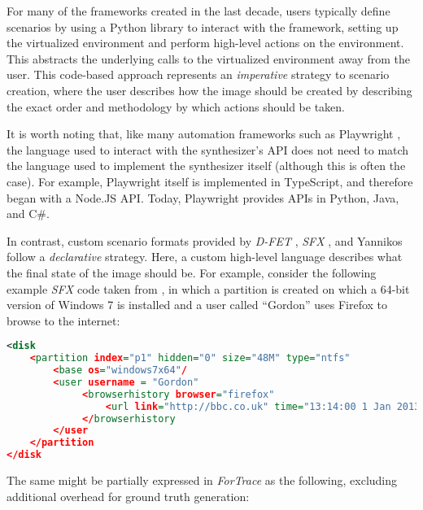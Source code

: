 For many of the frameworks created in the last decade, users typically
define scenarios by using a Python library to interact with the
framework, setting up the virtualized environment and perform high-level
actions on the environment. This abstracts the underlying calls to the
virtualized environment away from the user. This code-based approach
represents an \emph{imperative} strategy to scenario creation, where the
user describes how the image should be created by describing the exact
order and methodology by which actions should be taken.

It is worth noting that, like many automation frameworks such as
Playwright \cite{MicrosoftPlaywrightpython2025}, the language used
to interact with the synthesizer's API does not need to match the
language used to implement the synthesizer itself (although this is
often the case). For example, Playwright itself is implemented in
TypeScript, and therefore began with a Node.JS API. Today, Playwright
provides APIs in Python, Java, and C\#.

In contrast, custom scenario formats provided by \emph{D-FET}
\cite{williamCloudbasedDigitalForensics2011}, \emph{SFX}
\cite{russellForensicImageDescription2012}, and Yannikos
\cite{yannikosDataCorporaDigital2014} follow a \emph{declarative}
strategy. Here, a custom high-level language describes what the final
state of the image should be. For example, consider the following
example \emph{SFX} code taken from
\cite{russellForensicImageDescription2012}, in which a partition is
created on which a 64-bit version of Windows 7 is installed and a user
called ``Gordon'' uses Firefox to browse to the internet:

\begin{lstlisting}[language=XML]
<disk
    <partition index="p1" hidden="0" size="48M" type="ntfs"
        <base os="windows7x64"/
        <user username = "Gordon"
             <browserhistory browser="firefox"
                 <url link="http://bbc.co.uk" time="13:14:00 1 Jan 2013"/
             </browserhistory
        </user
    </partition
</disk
\end{lstlisting}

The same might be partially expressed in \emph{ForTrace} as the
following, excluding additional overhead for ground truth generation:

